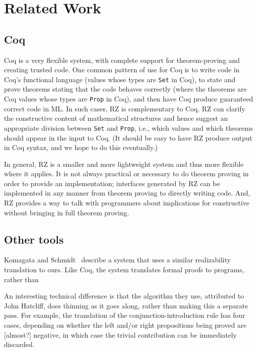 \section{Related Work}
\subsection{Coq}
\label{sec:comparison-with-coq}

Coq is a very flexible system, with complete support for theorem-proving and creating trusted code.  One common pattern of use for Coq is to write code in Coq's functional language (values whose types are \texttt{Set} in Coq), to state and prove theorems stating that the code behaves correctly (where the theorems are Coq values whose types are \texttt{Prop} in Coq), and then have Coq produce guaranteed correct code in ML.  In such cases, RZ is complementary to Coq.  RZ can clarify the constructive content of mathematical structures and hence suggest an appropriate division between \texttt{Set} and \texttt{Prop}, i.e., which values and which theorems should appear in the input to Coq.  (It should be easy to have RZ produce output in Coq syntax, and we hope to do this eventually.)

In general, RZ is a smaller and more lightweight system and thus more flexible where it applies.  It is not always practical or necessary to do theorem proving in order to provide an implementation; interfaces generated by RZ can be implemented in any manner from theorem proving to directly writing code.  And, RZ provides a way to talk with programmers about implications for constructive without bringing in full theorem proving.

\subsection{Other tools}

Komagata and Schmidt~\cite{komagata+:tr95} describe a system that uses
a similar realizability translation to ours.  Like Coq, the system
translates formal proofs to programs, rather than 

An interesting technical difference is that the algorithm they use,
attributed to John Hatcliff, does thinning as it goes along, rather
than making this a separate pass.  For example, the translation of the
conjunction-introduction rule has four cases, depending on whether the
left and/or right propositions being proved are [almost?] negative, in which
case the trivial contribution can be immediately discarded.

